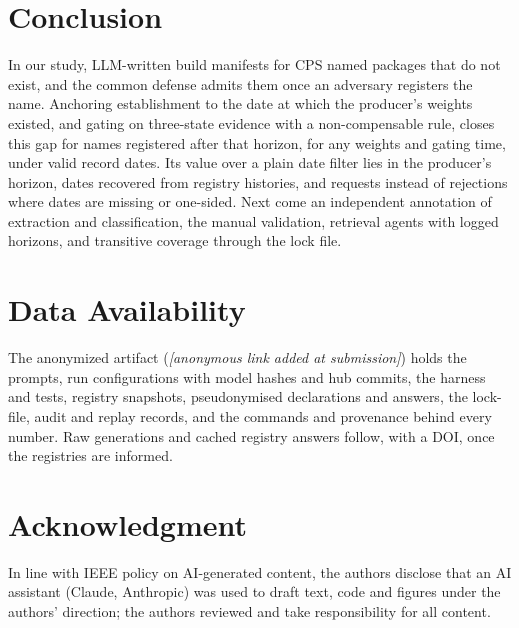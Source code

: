 \documentclass[conference]{IEEEtran}
\newif\ifanon      \anontrue        %
\newif\ifpilot     \pilotfalse      %
\providecommand{\rArtifactLink}{\textit{[anonymous link added at submission]}}
\begin{document}
\section{Conclusion}
\label{sec:conclusion}
In our \ifpilot pilot\else study\fi, LLM-written build manifests for CPS named packages that do not exist, and the common defense admits
them once an adversary registers the name. Anchoring establishment to the date at which the producer's weights
existed, and gating on three-state evidence with a non-compensable rule, closes this gap for names registered after
that horizon, for any weights and gating time, under valid record dates. Its value over a plain date filter lies in the
producer's horizon, dates recovered from registry histories, and requests instead of rejections where dates are missing
or one-sided. Next come \ifpilot the full study, \fi\ifnum{}\ifnum{} an independent
annotation of extraction and classification, \fi\else the manual validation, \fi retrieval agents with logged horizons,
and transitive coverage through the lock file.

\section*{Data Availability}
The anonymized artifact (\rArtifactLink) holds the prompts, run configurations with model hashes and hub commits,
the harness and tests, registry snapshots, pseudonymised declarations and answers, the lock-file, audit and replay
records, and the commands and provenance behind every number. Raw generations and cached registry answers follow,
with a DOI, once the registries are informed.

\section*{Acknowledgment}
\ifanon\else\fi
In line with IEEE policy on AI-generated content, the authors disclose that an AI assistant (Claude, Anthropic) was used
to draft text, code and figures under the authors' direction; the authors reviewed and take responsibility for all content.



\end{document}
